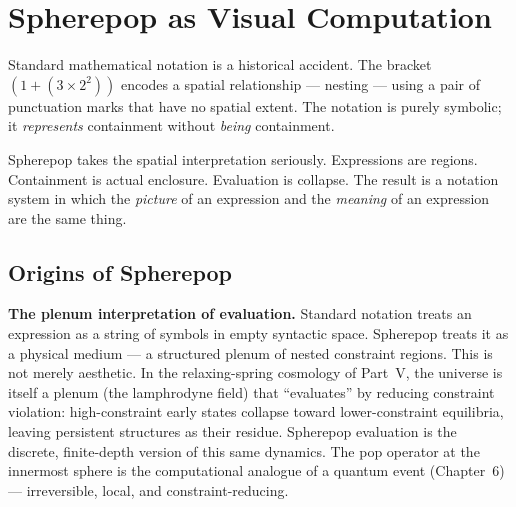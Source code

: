 
\chapter{Spherepop as Visual Computation}



Standard mathematical notation is a historical accident. The bracket
$(1 + (3 \times 2^2))$ encodes a spatial relationship — nesting — using
a pair of punctuation marks that have no spatial extent. The notation is
purely symbolic; it \emph{represents} containment without \emph{being}
containment.

Spherepop takes the spatial interpretation seriously. Expressions are
regions. Containment is actual enclosure. Evaluation is collapse. The
result is a notation system in which the \emph{picture} of an expression
and the \emph{meaning} of an expression are the same thing.

\section{Origins of Spherepop}

\begin{remark}
  \textbf{The plenum interpretation of evaluation.}
  Standard notation treats an expression as a string of symbols in
  empty syntactic space. Spherepop treats it as a physical medium —
  a structured plenum of nested constraint regions. This is not
  merely aesthetic. In the relaxing-spring cosmology of Part~V,
  the universe is itself a plenum (the lamphrodyne field) that
  ``evaluates'' by reducing constraint violation: high-constraint
  early states collapse toward lower-constraint equilibria, leaving
  persistent structures as their residue. Spherepop evaluation is
  the discrete, finite-depth version of this same dynamics.
  The pop operator at the innermost sphere is the computational
  analogue of a quantum event (Chapter~6) — irreversible, local,
  and constraint-reducing.
\end{remark}


